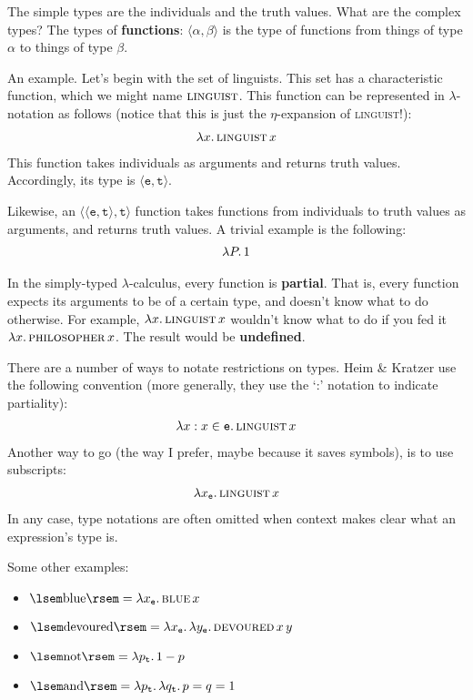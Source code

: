 \documentclass{article}
\newcommand{\con}[1]{\textsf{\textsc{#1}}}
\newcommand{\sv}[1]{\ensuremath{\lsem #1 \rsem}}
\newcommand{\ab}[1]{\ensuremath{\langle #1 \rangle}}
\begin{document}
The simple types are the individuals and the truth values. What are the complex
types? The types of \textbf{functions}: \ab{\alpha, \beta} is the type of
functions from things of type $\alpha$ to things of type $\beta$.

An example. Let's begin with the set of linguists. This set has a characteristic
function, which we might name $\con{linguist}$. This function can be represented
in $\lambda$-notation as follows (notice that this is just the $\eta$-expansion
of \con{linguist}!):
\begin{align}
  \notag
  \lambda x.\, \con{linguist}\, x
\end{align}
%
This function
takes individuals as arguments and returns truth values.  Accordingly, its type
is \ab{\texttt{e}, \texttt{t}}. 

Likewise, an \ab{\ab{\texttt{e},\texttt{t}},\texttt{t}} function takes functions
from individuals to truth values as arguments, and returns truth values. A
trivial example is the following:
\begin{align}
  \notag
  \lambda P.\, 1
\end{align}

In the simply-typed $\lambda$-calculus, every function is \textbf{partial}. That
is, every function expects its arguments to be of a certain type, and doesn't
know what to do otherwise. For example, $\lambda x.\, \con{linguist}\, x$
wouldn't know what to do if you fed it $\lambda x.\, \con{philosopher}\, x$. The
result would be \textbf{undefined}.

There are a number of ways to notate restrictions on types. Heim \& Kratzer use
the following convention (more generally, they use the `:' notation to
indicate partiality):
\begin{align}
  \notag
  \lambda x : x \in \texttt{e}.\, \con{linguist}\, x
\end{align}
%
Another way to go (the way I prefer, maybe because it saves symbols), is to use
subscripts:
\begin{align}
  \notag
  \lambda x_{\texttt{e}}.\, \con{linguist}\, x
\end{align}
%
In any case, type notations are often omitted when context makes clear what an
expression's type is.

Some other examples:
\begin{itemize}
  \item
    $\sv{\text{blue}} = \lambda x_{\texttt{e}}.\, \con{blue}\, x$

  \item
    $\sv{\text{devoured}} = \lambda x_{\texttt{e}}.\, \lambda y_{\texttt{e}}.\,
    \con{devoured}\, x\, y$

  \item
    $\sv{\text{not}} = \lambda p_{\texttt{t}}.\, 1 - p$

  \item
    $\sv{\text{and}} = \lambda p_{\texttt{t}}.\, \lambda q_{\texttt{t}}.\, p = q
    = 1$
\end{itemize}
\end{document}

